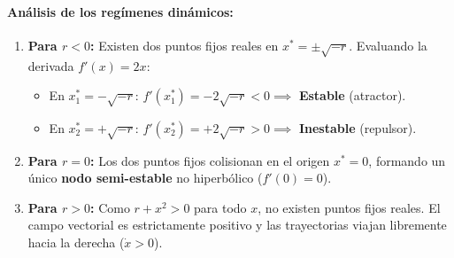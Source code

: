 \paragraph{Análisis de los regímenes dinámicos:}
\begin{enumerate}
    \item \textbf{Para $r < 0$:} Existen dos puntos fijos reales en $x^* = \pm\sqrt{-r}$. Evaluando la derivada $f'(x) = 2x$:
    \begin{itemize}
        \item En $x_1^* = -\sqrt{-r}$: $f'(x_1^*) = -2\sqrt{-r} < 0 \implies$ \textbf{Estable} (atractor).
        \item En $x_2^* = +\sqrt{-r}$: $f'(x_2^*) = +2\sqrt{-r} > 0 \implies$ \textbf{Inestable} (repulsor).
    \end{itemize}
    \item \textbf{Para $r = 0$:} Los dos puntos fijos colisionan en el origen $x^* = 0$, formando un único \textbf{nodo semi-estable} no hiperbólico ($f'(0) = 0$).
    \item \textbf{Para $r > 0$:} Como $r + x^2 > 0$ para todo $x$, no existen puntos fijos reales. El campo vectorial es estrictamente positivo y las trayectorias viajan libremente hacia la derecha ($\dot{x} > 0$).
\end{enumerate}


